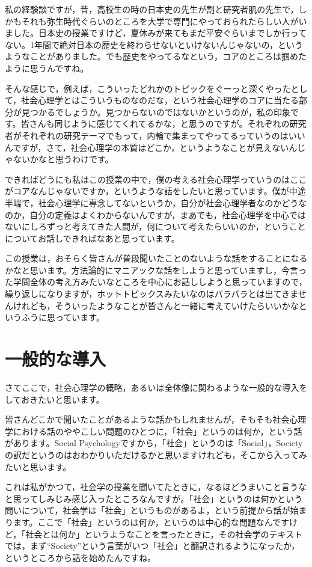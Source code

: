 \documentclass{ltjsbook}
\begin{document}
私の経験談ですが，昔，高校生の時の日本史の先生が割と研究者肌の先生で，しかもそれも弥生時代ぐらいのところを大学で専門にやっておられたらしい人がいました。日本史の授業ですけど，夏休みが来てもまだ平安ぐらいまでしか行ってない。1年間で絶対日本の歴史を終わらせないといけないんじゃないの，というようなことがありました。でも歴史をやってるなという，コアのところは掴めたように思うんですね。

そんな感じで，例えば，こういったどれかのトピックをぐーっと深くやったとして，社会心理学とはこういうものなのだな，という社会心理学のコアに当たる部分が見つかるでしょうか。見つからないのではないかというのが，私の印象です。皆さんも同じように感じてくれてるかな，と思うのですが。それぞれの研究者がそれぞれの研究テーマでもって，内輪で集まってやってるっていうのはいいんですが，さて，社会心理学の本質はどこか，というようなことが見えないんじゃないかなと思うわけです。

できればどうにも私はこの授業の中で，僕の考える社会心理学っていうのはここがコアなんじゃないですか，というような話をしたいと思っています。僕が中途半端で，社会心理学に専念してないというか，自分が社会心理学者なのかどうなのか，自分の定義はよくわからないんですが，まあでも，社会心理学を中心ではないにしろずっと考えてきた人間が，何について考えたらいいのか，ということについてお話しできればなあと思っています。　

この授業は，おそらく皆さんが普段聞いたことのないような話をすることになるかなと思います。方法論的にマニアックな話をしようと思っていますし，今言った学問全体の考え方みたいなところを中心にお話ししようと思っていますので，繰り返しになりますが，ホットトピックスみたいなのはパラパラとは出てきませんけれども，そういったようなことが皆さんと一緒に考えていけたらいいかなというふうに思っています。

\section{一般的な導入}

さてここで，社会心理学の概略，あるいは全体像に関わるような一般的な導入をしておきたいと思います。

皆さんどこかで聞いたことがあるような話かもしれませんが，そもそも社会心理学における話のややこしい問題のひとつに，「社会」というのは何か，という話があります。Social Psychologyですから，「社会」というのは「Social」，Societyの訳だというのはおわかりいただけるかと思いますけれども，そこから入ってみたいと思います。

これは私がかつて，社会学の授業を聞いてたときに，なるほどうまいこと言うなと思ってしみじみ感じ入ったところなんですが。「社会」というのは何かという問いについて，社会学は「社会」というものがあるよ，という前提から話が始まります。ここで「社会」というのは何か，というのは中心的な問題なんですけど，「社会とは何か」というようなことを言ったときに，その社会学のテキスト\parencite{SPkiso1990}では，まず``Society''という言葉がいつ「社会」と翻訳されるようになったか，というところから話を始めたんですね。
\end{document}
